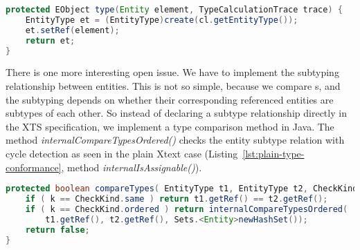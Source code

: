 \begin{lstlisting}[language=Java]
protected EObject type(Entity element, TypeCalculationTrace trace) {
    EntityType et = (EntityType)create(cl.getEntityType());
    et.setRef(element);
    return et;
}
\end{lstlisting}

There is one more interesting open issue. We have to implement the subtyping
relationship between entities. This is not so simple, because we compare
s, and the subtyping depends on whether their corresponding
referenced entities are subtypes of each other. So instead of declaring a subtype relationship directly
in the XTS specification, we implement a type comparison method in Java. The
method \emph{internalCompareTypesOrdered()} checks the entity subtype relation
with cycle detection as seen in the plain Xtext case
(Listing~\ref{lst:plain-type-conformance}, method
\emph{internalIsAssignable()}).


\begin{lstlisting}[language=Java]
protected boolean compareTypes( EntityType t1, EntityType t2, CheckKind k, TypeCalculationTrace trace ) {
    if ( k == CheckKind.same ) return t1.getRef() == t2.getRef();
    if ( k == CheckKind.ordered ) return internalCompareTypesOrdered(
        t1.getRef(), t2.getRef(), Sets.<Entity>newHashSet());
    return false; 
}
\end{lstlisting}


  
